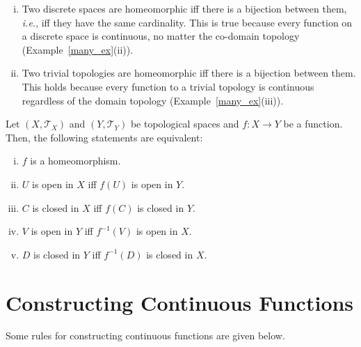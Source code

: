 \documentclass[a4paper,english,12pt]{article}
\begin{document}
\begin{exmp}
\begin{enumerate}[i)]
\item Two discrete spaces are homeomorphic iff there is a bijection between them, \emph{i.e.}, iff they have the same cardinality. This is true because every function on a discrete space is continuous, no matter the co-domain topology (Example~\ref{many_ex}(ii)). 
\item Two trivial topologies are homeomorphic iff there is a bijection between them. This holds because every function to a trivial topology is continuous regardless of the domain topology (Example~\ref{many_ex}(iii)). 
\end{enumerate}
\end{exmp}

\begin{prop} Let $(X,\mathcal{T}_X)$ and $(Y,\mathcal{T}_Y)$ be topological spaces and $f:X\rightarrow Y$ be a function. Then, the following statements are equivalent:
\begin{enumerate}[i)]
\item $f$ is a homeomorphism.
\item $U$ is open in $X$ iff $f(U)$ is open in $Y$.
\item $C$ is closed in $X$ iff $f(C)$ is closed in $Y$.
\item $V$ is open in $Y$ iff $f^{-1}(V)$ is open in $X$.
\item $D$ is closed in $Y$ iff $f^{-1}(D)$ is closed in $X$.
\end{enumerate}
\end{prop}

\section{Constructing Continuous Functions}
Some rules for constructing continuous functions are given below.
\end{document}
